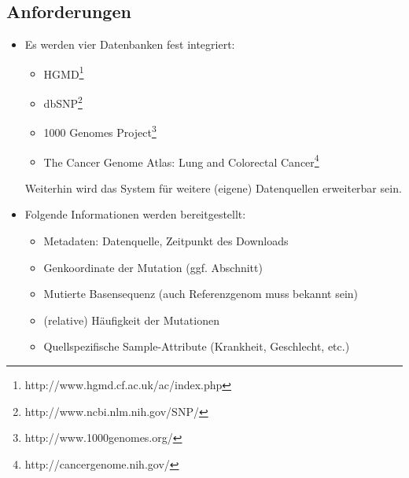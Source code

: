 \subsection{Anforderungen}
\begin{itemize}

\item Es werden vier Datenbanken fest integriert: 
\begin{itemize}
\item HGMD\footnote{\label{foot:1}http://www.hgmd.cf.ac.uk/ac/index.php}
\item dbSNP\footnote{\label{foot:2}http://www.ncbi.nlm.nih.gov/SNP/}
\item 1000 Genomes Project\footnote{\label{foot:3}http://www.1000genomes.org/}
\item The Cancer Genome Atlas: Lung and Colorectal Cancer\footnote{\label{foot:4}http://cancergenome.nih.gov/}
\end{itemize}
Weiterhin wird das System für weitere (eigene) Datenquellen erweiterbar sein.

\item Folgende Informationen werden bereitgestellt:
\begin{itemize}
\item Metadaten: Datenquelle, Zeitpunkt des Downloads
\item Genkoordinate der Mutation (ggf. Abschnitt)
\item Mutierte Basensequenz (auch Referenzgenom muss bekannt sein)
\item (relative) Häufigkeit der Mutationen
\item Quellspezifische Sample-Attribute (Krankheit, Geschlecht, etc.)
\end{itemize}


\end{itemize}
